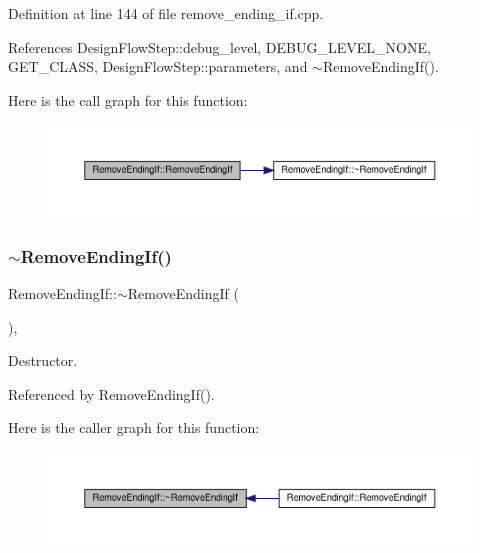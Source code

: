 Definition at line 144 of file remove\+\_\+ending\+\_\+if.\+cpp.



References Design\+Flow\+Step\+::debug\+\_\+level, D\+E\+B\+U\+G\+\_\+\+L\+E\+V\+E\+L\+\_\+\+N\+O\+NE, G\+E\+T\+\_\+\+C\+L\+A\+SS, Design\+Flow\+Step\+::parameters, and $\sim$\+Remove\+Ending\+If().

Here is the call graph for this function\+:
\nopagebreak
\begin{figure}[H]
\begin{center}
\leavevmode
\includegraphics[width=350pt]{d3/d05/classRemoveEndingIf_ac2051e107a830095132efb28fa2b38b4_cgraph}
\end{center}
\end{figure}
\mbox{\label{classRemoveEndingIf_ac8c1c51f1225d0aec0afd4329c913395}} 
\subsubsection{\texorpdfstring{$\sim$\+Remove\+Ending\+If()}{~RemoveEndingIf()}}
{\footnotesize\ttfamily Remove\+Ending\+If\+::$\sim$\+Remove\+Ending\+If (\begin{DoxyParamCaption}{ }\end{DoxyParamCaption})\hspace{0.3cm}{\ttfamily [override]}, {\ttfamily [default]}}



Destructor. 



Referenced by Remove\+Ending\+If().

Here is the caller graph for this function\+:
\nopagebreak
\begin{figure}[H]
\begin{center}
\leavevmode
\includegraphics[width=350pt]{d3/d05/classRemoveEndingIf_ac8c1c51f1225d0aec0afd4329c913395_icgraph}
\end{center}
\end{figure}


